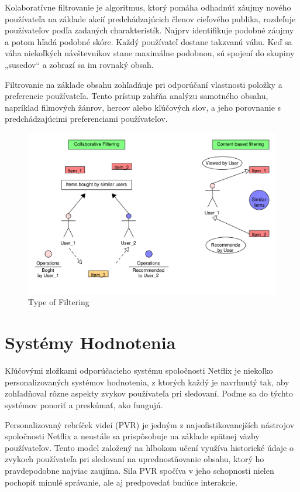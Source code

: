 \documentclass[10pt,slovak,a4paper]{article}
\begin{document}
Kolaboratívne filtrovanie je algoritmus, ktorý pomáha odhadnúť záujmy nového používateľa na základe akcií predchádzajúcich členov cieľového publika, rozdeľuje používateľov podľa zadaných charakteristík. Najprv identifikuje podobné záujmy a potom hľadá podobné skóre. Každý používateľ dostane takzvanú váhu. Keď sa váha niekoľkých návštevníkov stane maximálne podobnou, sú spojení do skupiny „susedov“ a zobrazí sa im rovnaký obsah.\cite{Collaborative:Filtering}

Filtrovanie na základe obsahu zohľadňuje pri odporúčaní vlastnosti položky a preferencie používateľa. Tento prístup zahŕňa analýzu samotného obsahu, napríklad filmových žánrov, hercov alebo kľúčových slov, a jeho porovnanie s predchádzajúcimi preferenciami používateľov.\cite{Linkedin}



\begin{figure}[h!]
  \centering
  \includegraphics[width=1\textwidth]{Images/Filtering_pdf.pdf} %
  \caption{Type of Filtering}
\end{figure}

\section{Systémy Hodnotenia}
 Kľúčovými zložkami odporúčacieho systému spoločnosti Netflix je niekoľko personalizovaných systémov hodnotenia, z ktorých každý je navrhnutý tak, aby zohľadňoval rôzne aspekty zvykov používateľa pri sledovaní. Poďme sa do týchto systémov ponoriť a preskúmať, ako fungujú.

Personalizovaný rebríček videí (PVR) je jedným z najsofistikovanejších nástrojov spoločnosti Netflix a neustále sa prispôsobuje na základe spätnej väzby používateľov. Tento model založený na hlbokom učení využíva historické údaje o zvykoch používateľa pri sledovaní na uprednostňovanie obsahu, ktorý ho pravdepodobne najviac zaujíma. Sila PVR spočíva v jeho schopnosti nielen pochopiť minulé správanie, ale aj predpovedať budúce interakcie.\cite{Argoid}\cite{Data}
\end{document}
